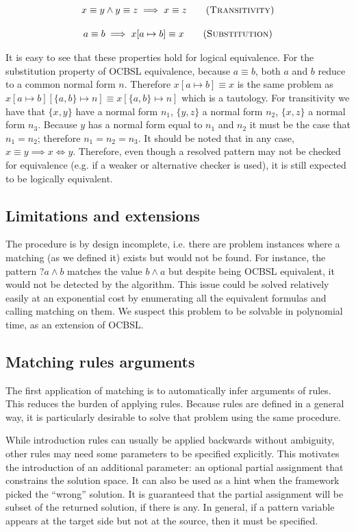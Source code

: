 \begin{gather}
  {x \equiv y \land y \equiv z} \implies {x \equiv z} \tag{\textsc{Transitivity}} \\[1em]
  {a \equiv b} \implies {x[a \mapsto b] \equiv x} \tag{\textsc{Substitution}}
\end{gather}

It is easy to see that these properties hold for logical equivalence. For the substitution property of OCBSL equivalence, because $a \equiv b$, both $a$ and $b$ reduce to a common normal form $n$. Therefore $x[a \mapsto b] \equiv x$ is the same problem as $x[a \mapsto b][\{a, b\} \mapsto n] \equiv x[\{a, b\} \mapsto n]$ which is a tautology. For transitivity we have that $\{x, y\}$ have a normal form $n_1$, $\{y, z\}$ a normal form $n_2$, $\{x, z\}$ a normal form $n_3$. Because $y$ has a normal form equal to $n_1$ and $n_2$ it must be the case that $n_1 = n_2$; therefore $n_1 = n_2 = n_3$.
It should be noted that in any case, $x \equiv y \implies x \Leftrightarrow y$. Therefore, even though a resolved pattern may not be checked for equivalence (e.g. if a weaker or alternative checker is used), it is still expected to be logically equivalent.

\subsection{Limitations and extensions}

The procedure is by design incomplete, i.e. there are problem instances where a matching (as we defined it) exists but would not be found. For instance, the pattern ${?a} \land b$ matches the value $b \land a$ but despite being OCBSL equivalent, it would not be detected by the algorithm. This issue could be solved relatively easily at an exponential cost by enumerating all the equivalent formulas and calling matching on them. We suspect this problem to be solvable in polynomial time, as an extension of OCBSL.

\subsection{Matching rules arguments}

The first application of matching is to automatically infer arguments of rules. This reduces the burden of applying rules. Because rules are defined in a general way, it is particularly desirable to solve that problem using the same procedure.

While introduction rules can usually be applied backwards without ambiguity, other rules may need some parameters to be specified explicitly. This motivates the introduction of an additional parameter: an optional partial assignment that constrains the solution space. It can also be used as a hint when the framework picked the ``wrong'' solution. It is guaranteed that the partial assignment will be subset of the returned solution, if there is any. In general, if a pattern variable appears at the target side but not at the source, then it must be specified.
